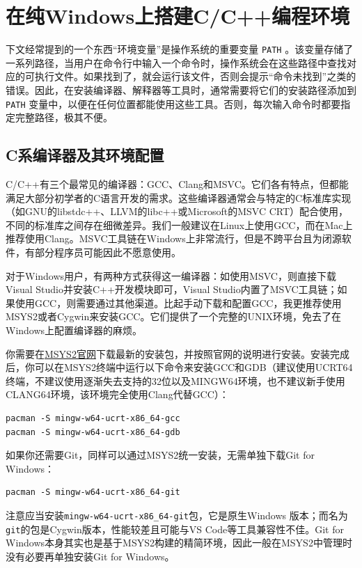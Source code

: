 \section{在纯Windows上搭建C/C++编程环境}\label{sec:c-install-on-windows}

\begin{note}
  下文经常提到的一个东西“环境变量”是操作系统的重要变量 \texttt{PATH} 。该变量存储了一系列路径，当用户在命令行中输入一个命令时，操作系统会在这些路径中查找对应的可执行文件。如果找到了，就会运行该文件，否则会提示“命令未找到”之类的错误。因此，在安装编译器、解释器等工具时，通常需要将它们的安装路径添加到 \texttt{PATH} 变量中，以便在任何位置都能使用这些工具。否则，每次输入命令时都要指定完整路径，极其不便。
\end{note}

\subsection{C系编译器及其环境配置}\label{sec:c-install}

C/C++有三个最常见的编译器：GCC、Clang和MSVC。它们各有特点，但都能满足大部分初学者的C语言开发的需求。这些编译器通常会与特定的C标准库实现（如GNU的libstdc++、LLVM的libc++或Microsoft的MSVC CRT）配合使用，不同的标准库之间存在细微差异。我们一般建议在Linux上使用GCC，而在Mac上推荐使用Clang。MSVC工具链在Windows上非常流行，但是不跨平台且为闭源软件，有部分程序员可能因此不愿意使用。

对于Windows用户，有两种方式获得这一编译器：如使用MSVC，则直接下载Visual Studio并安装C++开发模块即可，Visual Studio内置了MSVC工具链；如果使用GCC，则需要通过其他渠道。比起手动下载和配置GCC，我更推荐使用MSYS2或者Cygwin来安装GCC。它们提供了一个完整的UNIX环境，免去了在Windows上配置编译器的麻烦。

你需要在\href{https://www.msys2.org/}{MSYS2官网}下载最新的安装包，并按照官网的说明进行安装。安装完成后，你可以在MSYS2终端中运行以下命令来安装GCC和GDB（建议使用UCRT64终端，不建议使用逐渐失去支持的32位以及MINGW64环境，也不建议新手使用CLANG64环境，该环境完全使用Clang代替GCC）：

\begin{verbatim}
pacman -S mingw-w64-ucrt-x86_64-gcc
pacman -S mingw-w64-ucrt-x86_64-gdb
\end{verbatim}

如果你还需要Git，同样可以通过MSYS2统一安装，无需单独下载Git for Windows：
\begin{verbatim}
pacman -S mingw-w64-ucrt-x86_64-git
\end{verbatim}
注意应当安装\texttt{mingw-w64-ucrt-x86\_64-git}包，它是原生Windows 版本；而名为\texttt{git}的包是Cygwin版本，性能较差且可能与VS Code等工具兼容性不佳。Git for Windows本身其实也是基于MSYS2构建的精简环境，因此一般在MSYS2中管理时没有必要再单独安装Git for Windows。

